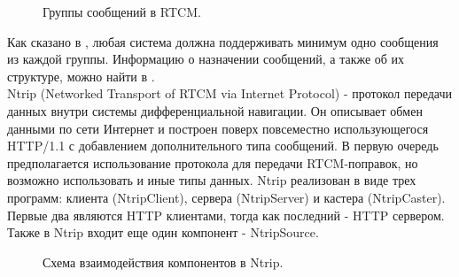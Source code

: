 \documentclass[a4paper,12pt]{report}
\begin{document}
\begin{figure}[h]
\caption{Группы сообщений в RTCM.}
\label{rtcm_groups}
\end{figure}

Как сказано в \cite{rtcm}, любая система должна поддерживать минимум одно сообщения из каждой группы. Информацию о назначении сообщений, а 
также об их структуре, можно найти в \cite{rtcm}. \\
Ntrip (Networked Transport of RTCM via Internet Protocol) - протокол передачи данных внутри системы дифференциальной навигации. Он описывает 
обмен данными по сети Интернет и построен поверх повсеместно использующегося HTTP/1.1 с добавлением дополнительного типа сообщений. В первую 
очередь предполагается использование протокола для передачи RTCM-поправок, но возможно использовать и иные типы данных. Ntrip реализован в 
виде трех программ: клиента (NtripClient), сервера (NtripServer) и кастера (NtripCaster). Первые два являются HTTP клиентами, тогда как 
последний  - HTTP сервером. Также в Ntrip входит еще один компонент - NtripSource. \\

\begin{figure}[h]
\caption{Схема взаимодействия компонентов в Ntrip.}
\label{ntrip}
\end{figure}
\end{document}
